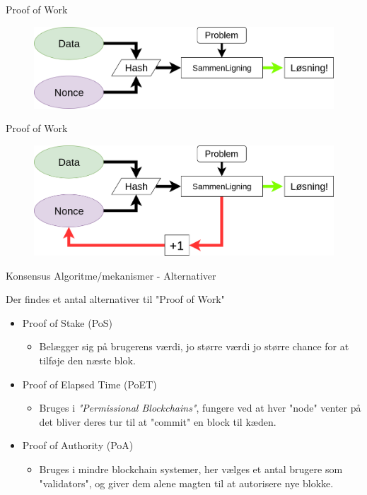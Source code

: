 \documentclass[12pt,t]{beamer}
\begin{document}
\begin{frame}{Proof of Work}
\begin{figure}
	\centering
	\includegraphics[width=1.1\textwidth]{pow.png}
\end{figure}
\end{frame}
\begin{frame}{Proof of Work}
\begin{figure}
	\centering
	\includegraphics[width=1.1\textwidth]{pow2.png}
\end{figure}
\end{frame}

\begin{frame}{Konsensus Algoritme/mekanismer - Alternativer}
\begin{block}{Der findes et antal alternativer til "Proof of Work"}
	\begin{itemize}
		\item Proof of Stake (PoS)
		\begin{itemize}
			\item Belægger sig på brugerens værdi, jo større værdi jo større chance for at tilføje den næste blok.
		\end{itemize}
		\item Proof of Elapsed Time (PoET)
		\begin{itemize}
			\item Bruges i \textit{"Permissional Blockchains"}, fungere ved at hver "node" venter på det bliver deres tur til at "commit" en block til kæden. 
		\end{itemize}
		\item Proof of Authority (PoA)
		\begin{itemize}
			\item Bruges i mindre blockchain systemer, her vælges et antal brugere som "validators", og giver dem alene magten til at autorisere nye blokke.
		\end{itemize}
	\end{itemize}
\end{block}
\end{frame}
\end{document}
